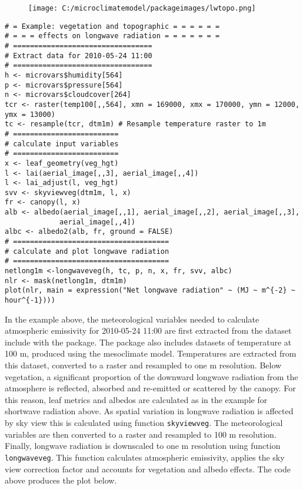 \documentclass[]{article}
\begin{document}
\begin{figure}
\centering
\texttt{[image: C:/microclimatemodel/packageimages/lwtopo.png]}
\caption{}
\end{figure}

\begin{verbatim}
# = Example: vegetation and topographic = = = = = = 
# = = = effects on longwave radiation = = = = = = = 
# =================================
# Extract data for 2010-05-24 11:00
# =================================
h <- microvars$humidity[564]
p <- microvars$pressure[564]
n <- microvars$cloudcover[264]
tcr <- raster(temp100[,,564], xmn = 169000, xmx = 170000, ymn = 12000, ymx = 13000)
tc <- resample(tcr, dtm1m) # Resample temperature raster to 1m
# =========================
# calculate input variables
# =========================
x <- leaf_geometry(veg_hgt)
l <- lai(aerial_image[,,3], aerial_image[,,4])
l <- lai_adjust(l, veg_hgt)
svv <- skyviewveg(dtm1m, l, x)
fr <- canopy(l, x)
alb <- albedo(aerial_image[,,1], aerial_image[,,2], aerial_image[,,3],
             aerial_image[,,4])
albc <- albedo2(alb, fr, ground = FALSE)
# =====================================
# calculate and plot longwave radiation
# =====================================
netlong1m <-longwaveveg(h, tc, p, n, x, fr, svv, albc)
nlr <- mask(netlong1m, dtm1m)
plot(nlr, main = expression("Net longwave radiation" ~ (MJ ~ m^{-2} ~   hour^{-1})))
\end{verbatim}

In the example above, the meteorological variables needed to calculate
atmospheric emissivity for 2010-05-24 11:00 are first extracted from the
dataset include with the package. The package also includes datasets of
temperature at 100 m, produced using the mesoclimate model. Temperatures
are extracted from this dataset, converted to a raster and resampled to
one m resolution. Below vegetation, a significant proportion of the
downward longwave radiation from the atmosphere is reflected, absorbed
and re-emitted or scattered by the canopy. For this reason, leaf metrics
and albedos are calculated as in the example for shortwave radiation
above. As spatial variation in longwave radiation is affected by sky
view this is calculated using function \texttt{skyviewveg}. The
meteorological variables are then converted to a raster and resampled to
100 m resolution. Finally, longwave radiation is downscaled to one m
resolution using function \texttt{longwaveveg}. This function calculates
atmospheric emissivity, applies the sky view correction factor and
accounts for vegetation and albedo effects. The code above produces the
plot below.
\end{document}
